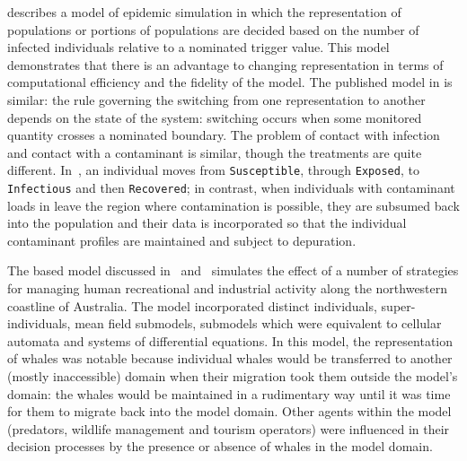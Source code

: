 
\Cite{bobashev2007hybrid} describes a model of epidemic simulation in
which the representation of populations or portions of populations are
decided based on the number of infected individuals relative to a
nominated trigger value. This model demonstrates that there is an
advantage to changing representation in terms of computational
efficiency and the fidelity of the model. The published model in
\Ctwo is similar: the rule governing the
switching from one representation to another depends on the state of
the system: switching occurs when some monitored quantity crosses a
nominated boundary. The problem of contact with infection and contact
with a contaminant is similar, though the treatments are quite
different. In~\citet{bobashev2007hybrid}, an individual moves
from \texttt{Susceptible}, through \texttt{Exposed},
to \texttt{Infectious} and then \texttt{Recovered}; in contrast, when
individuals with contaminant loads in \Ctwo
leave the region where contamination is possible, they are subsumed
back into the population and their data is incorporated so that the
individual contaminant profiles are maintained and subject to
depuration.

The \InVitro based model discussed in~\cite{gray2014}
and~\cite{fulton2009crossingscales} simulates the effect of a number
of strategies for managing human recreational and industrial activity
along the northwestern coastline of Australia. The model 
incorporated distinct individuals, super-individuals, mean field
submodels, submodels which were equivalent to cellular automata and
systems of differential equations. In this model, the representation
of whales was notable because individual whales would be transferred
to another (mostly inaccessible) domain when their migration took them
outside the model's domain: the whales would be maintained in a
rudimentary way until it was time for them to migrate back into the
model domain. Other agents within the model (predators, wildlife
management and tourism operators) were influenced in their decision
processes by the presence or absence of whales in the model domain.


